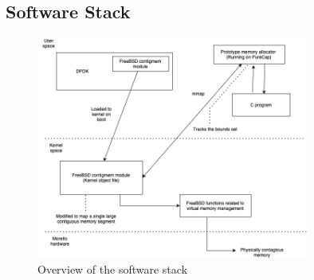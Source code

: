 

\subsection{Software Stack}
\begin{figure}[h]
\includegraphics[width=0.8\textwidth]{diagrams/SoftwareStack24.png}
\caption{Overview of the software stack}
\label{fig:SoftwareStack}
\end{figure}


